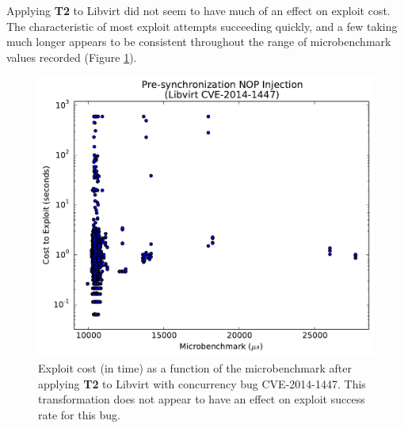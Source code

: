 Applying \textbf{T2} to Libvirt did not seem to have much of an effect on exploit cost.
The characteristic of most exploit attempts succeeding quickly, and a few taking much longer appears to be consistent throughout the range of microbenchmark values recorded (Figure \ref{fig_libvirt-pre}).
\begin{figure}
	\centering
	\includegraphics[width=\columnwidth]{figures/libvirt-pre}
	\caption{
		Exploit cost (in time) as a function of the microbenchmark after applying \textbf{T2} to Libvirt with concurrency bug CVE-2014-1447.
		This transformation does not appear to have an effect on exploit success rate for this bug.
	}
	\label{fig_libvirt-pre}
\end{figure}

